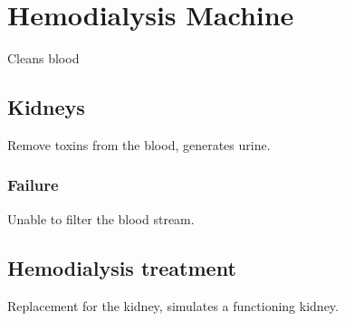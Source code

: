 \section{Hemodialysis Machine}
Cleans blood
\subsection{Kidneys}
Remove toxins from the blood, generates urine.
\subsubsection{Failure}
Unable to filter the blood stream.
\subsection{Hemodialysis treatment}
Replacement for the kidney, simulates a functioning kidney.